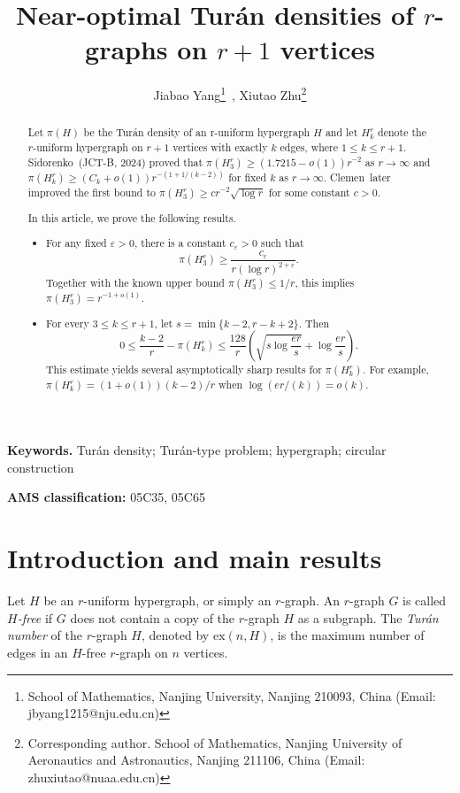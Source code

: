 \documentclass[12pt,a4paper]{article}
\title{Near-optimal Tur\'an densities of $r$-graphs on $r+1$ vertices}
\author{Jiabao Yang\thanks{School of Mathematics, Nanjing University, Nanjing 210093, China (Email: jbyang1215@nju.edu.cn)}~,
Xiutao Zhu\thanks{Corresponding author. School of Mathematics, Nanjing University of Aeronautics and Astronautics, Nanjing 211106, China (Email: zhuxiutao@nuaa.edu.cn)}
}
\date{}
\numberwithin{equation}{section}
\theoremstyle{definition}
\theoremstyle{remark}
\begin{document}
\maketitle
\vspace{-1.2em}

\begin{abstract}
Let $\pi(H)$ be the Tur\'an density of an r-uniform hypergraph $H$ and let $H_k^r$ denote the $r$-uniform hypergraph on $r+1$ vertices with exactly $k$ edges, where $1\le k\le r+1$.  
Sidorenko~(JCT-B, 2024) proved that
$\pi(H_3^r)\ge (1.7215-o(1))r^{-2}$ as $r\to\infty$ and 
$\pi(H_k^r)\ge (C_k+o(1))r^{-(1+1/(k-2))}$ for fixed $k$ as $r\to\infty$.  
Clemen~later improved the first bound to $\pi(H_3^r)\ge cr^{-2}\sqrt{\log r}$ for some constant $c>0$.

In this article, we prove the following results.
\begin{itemize}
\item For any fixed $\varepsilon>0$, there is a constant $c_\varepsilon>0$ such that
$$\pi(H_3^r)\ge \frac{c_\varepsilon}{r(\log r)^{2+\varepsilon}}.$$
Together with the known upper bound $\pi(H_3^r)\le1/r$, this implies
$\pi(H_3^r)=r^{-1+o(1)}$.

\item For every $3\le k\le r+1$, let
$s=\min\{k-2,r-k+2\}$.  Then
\begin{equation*}
 0\le \frac{k-2}{r}-\pi(H_k^r)
 \le \frac{128}{r}\left(\sqrt{s\log\frac{er}{s}}+\log\frac{er}{s}\right).
\end{equation*}
This estimate yields several asymptotically sharp results for $\pi(H_k^r)$.   For
example, $\pi(H_k^r)=(1+o(1))(k-2)/r$
when $\log(er/(k))=o(k)$.

\end{itemize}
\end{abstract}

\medskip
\noindent\textbf{Keywords.} Tur\'an density; Tur\'an-type problem; hypergraph; circular construction

\medskip
\noindent\textbf{AMS classification:} 05C35, 05C65

\section{Introduction and main results}

Let $H$ be an $r$-uniform hypergraph, or simply an $r$-graph.
An $r$-graph $G$ is called {\em $H$-free} if $G$ does not contain a copy of the $r$-graph $H$ as a subgraph.
The {\em Tur\'{a}n number} of the $r$-graph $H$, denoted by $\mathrm{ex}(n,H)$, is the maximum number of edges in an $H$-free $r$-graph on $n$ vertices. 
\end{document}
